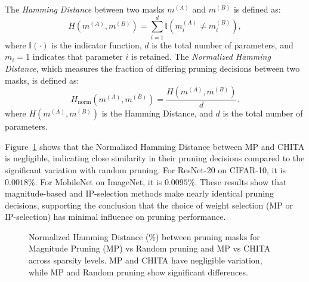 The \textit{Hamming Distance} between two masks \( m^{(A)} \) and \( m^{(B)} \) is defined as:
\[
H(m^{(A)}, m^{(B)}) = \sum_{i=1}^d \mathbb{I}\left(m^{(A)}_i \neq m^{(B)}_i\right),
\]
where \( \mathbb{I}(\cdot) \) is the indicator function, \( d \) is the total number of parameters, and \( m_i = 1 \) indicates that parameter \( i \) is retained. The \textit{Normalized Hamming Distance}, which measures the fraction of differing pruning decisions between two masks, is defined as:  
\[
H_{\text{norm}}(m^{(A)}, m^{(B)}) = \frac{H(m^{(A)}, m^{(B)})}{d}.
\]
where \( H(m^{(A)}, m^{(B)}) \) is the Hamming Distance, and \( d \) is the total number of parameters.


Figure~\ref{fig:normalized_hamming} shows that the Normalized Hamming Distance between MP and CHITA is negligible, indicating close similarity in their pruning decisions compared to the significant variation with random pruning. For ResNet-20 on CIFAR-10, it is \(0.0018\%\). For MobileNet on ImageNet, it is \(0.0095\%\). These results show that magnitude-based and IP-selection methods make nearly identical pruning decisions, supporting the conclusion that the choice of weight selection (MP or IP-selection) has minimal influence on pruning performance.

\begin{figure}[h]
\centering
{}
\caption{Normalized Hamming Distance (\%) between pruning masks for Magnitude Pruning (MP) vs Random pruning and MP vs CHITA across sparsity levels. MP and CHITA have negligible variation, while MP and Random pruning show significant differences.}
\label{fig:normalized_hamming}
\end{figure}